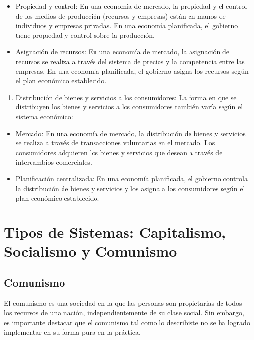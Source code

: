 \documentclass[
  man,
  floatsintext,
  longtable,
  a4paper,
  nolmodern,
  notxfonts,
  notimes,
  colorlinks=true,linkcolor=blue,citecolor=blue,urlcolor=blue]{apa7}
\providecommand{\tightlist}{%
  \setlength{\itemsep}{0pt}\setlength{\parskip}{0pt}}
\begin{document}
\begin{itemize}
\item
  Propiedad y control: En una economía de mercado, la propiedad y el
  control de los medios de producción (recursos y empresas) están en
  manos de individuos y empresas privadas. En una economía planificada,
  el gobierno tiene propiedad y control sobre la producción.
\item
  Asignación de recursos: En una economía de mercado, la asignación de
  recursos se realiza a través del sistema de precios y la competencia
  entre las empresas. En una economía planificada, el gobierno asigna
  los recursos según el plan económico establecido.
\end{itemize}

\begin{enumerate}
\def\labelenumi{\arabic{enumi}.}
\setcounter{enumi}{3}
\tightlist
\item
  Distribución de bienes y servicios a los consumidores: La forma en que
  se distribuyen los bienes y servicios a los consumidores también varía
  según el sistema económico:
\end{enumerate}

\begin{itemize}
\item
  Mercado: En una economía de mercado, la distribución de bienes y
  servicios se realiza a través de transacciones voluntarias en el
  mercado. Los consumidores adquieren los bienes y servicios que desean
  a través de intercambios comerciales.
\item
  Planificación centralizada: En una economía planificada, el gobierno
  controla la distribución de bienes y servicios y los asigna a los
  consumidores según el plan económico establecido.
\end{itemize}

\section{Tipos de Sistemas: Capitalismo, Socialismo y
Comunismo}\label{tipos-de-sistemas-capitalismo-socialismo-y-comunismo}

\subsection{Comunismo}\label{comunismo}

El comunismo es una sociedad en la que las personas son propietarias de
todos los recursos de una nación, independientemente de su clase social.
Sin embargo, es importante destacar que el comunismo tal como lo
describiste no se ha logrado implementar en su forma pura en la
práctica.
\end{document}
